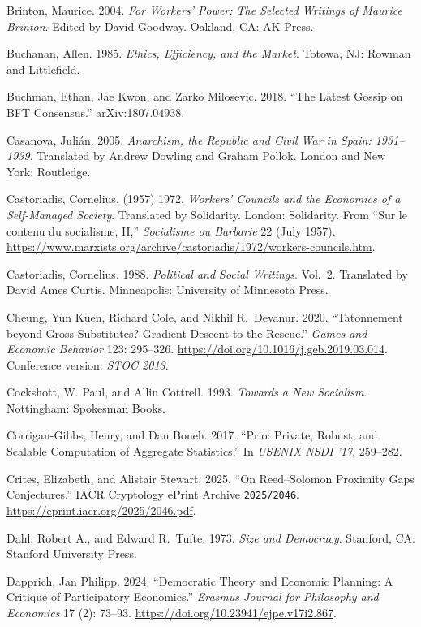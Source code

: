 \documentclass[10pt,twoside,openany]{book}
\theoremstyle{dpepstyle}
\begin{document}
\begin{list}{}{\setlength{\leftmargin}{1.8em}\setlength{\itemindent}{-1.8em}\setlength{\itemsep}{3pt}\setlength{\parsep}{0pt}}
\item Brinton, Maurice. 2004. \emph{For Workers' Power: The Selected Writings of Maurice Brinton}. Edited by David Goodway. Oakland, CA: AK Press.
\item Buchanan, Allen. 1985. \emph{Ethics, Efficiency, and the Market}. Totowa, NJ: Rowman and Littlefield.
\item Buchman, Ethan, Jae Kwon, and Zarko Milosevic. 2018. ``The Latest Gossip on BFT Consensus.'' arXiv:1807.04938.
\item Casanova, Juli\'an. 2005. \emph{Anarchism, the Republic and Civil War in Spain: 1931--1939}. Translated by Andrew Dowling and Graham Pollok. London and New York: Routledge.
\item Castoriadis, Cornelius. (1957) 1972. \emph{Workers' Councils and the Economics of a Self-Managed Society}. Translated by Solidarity. London: Solidarity. From ``Sur le contenu du socialisme, II,'' \emph{Socialisme ou Barbarie} 22 (July 1957). \url{https://www.marxists.org/archive/castoriadis/1972/workers-councils.htm}.
\item Castoriadis, Cornelius. 1988. \emph{Political and Social Writings}. Vol.~2. Translated by David Ames Curtis. Minneapolis: University of Minnesota Press.
\item Cheung, Yun Kuen, Richard Cole, and Nikhil R.\ Devanur. 2020. ``Tatonnement beyond Gross Substitutes? Gradient Descent to the Rescue.'' \emph{Games and Economic Behavior} 123: 295--326. \url{https://doi.org/10.1016/j.geb.2019.03.014}. Conference version: \emph{STOC 2013}.
\item Cockshott, W. Paul, and Allin Cottrell. 1993. \emph{Towards a New Socialism}. Nottingham: Spokesman Books.
\item Corrigan-Gibbs, Henry, and Dan Boneh. 2017. ``Prio: Private, Robust, and Scalable Computation of Aggregate Statistics.'' In \emph{USENIX NSDI '17}, 259--282.
\item Crites, Elizabeth, and Alistair Stewart. 2025. ``On Reed--Solomon Proximity Gaps Conjectures.'' IACR Cryptology ePrint Archive \texttt{2025/2046}. \url{https://eprint.iacr.org/2025/2046.pdf}.
\item Dahl, Robert A., and Edward R.\ Tufte. 1973. \emph{Size and Democracy}. Stanford, CA: Stanford University Press.
\item Dapprich, Jan Philipp. 2024. ``Democratic Theory and Economic Planning: A Critique of Participatory Economics.'' \emph{Erasmus Journal for Philosophy and Economics} 17 (2): 73--93. \url{https://doi.org/10.23941/ejpe.v17i2.867}.

\end{list}
\end{document}
